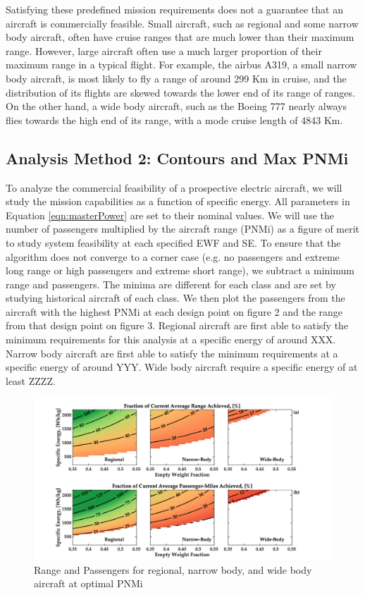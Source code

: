 \documentclass{achemso}
\begin{document}
Satisfying these predefined mission requirements does not a guarantee that an aircraft is commercially feasible. Small aircraft, such as regional and some narrow body aircraft, often have cruise ranges that are much lower than their maximum range. However, large aircraft often use a much larger proportion of their maximum range in a typical flight. For example, the airbus A319, a small narrow body aircraft, is most likely to fly a range of around 299 Km in cruise, and the distribution of its flights are skewed towards the lower end of its range of ranges. On the other hand, a wide body aircraft, such as the Boeing 777 nearly always flies towards the high end of its range, with a mode cruise length of 4843 Km. 

\subsection{Analysis Method 2: Contours and Max PNMi}

To analyze the commercial feasibility of a prospective electric aircraft, we will study the mission capabilities as a function of specific energy. All parameters in Equation \eqref{eqn:masterPower} are set to their nominal values. We will use the number of passengers multiplied by the aircraft range (PNMi) as a figure of merit to study system feasibility at each specified EWF and SE. To ensure that the algorithm does not converge to a corner case (e.g. no passengers and extreme long range or high passengers and extreme short range), we subtract a minimum range and passengers. The minima are different for each class and are set by studying historical aircraft of each class. We then plot the passengers from the aircraft with the highest PNMi at each design point on figure 2 and the range from that design point on figure 3. Regional aircraft are first able to satisfy the minimum requirements for this analysis at a specific energy of around XXX. Narrow body aircraft are first able to satisfy the minimum requirements at a specific energy of around YYY. Wide body aircraft require a specific energy of at least ZZZZ. 

\begin{figure}[htp]
\centering
\includegraphics[width=\textwidth]{Figures/contours.png}\hfill
\caption{Range and Passengers for regional, narrow body, and wide body aircraft at optimal PNMi}
\label{fig:figure2}
\end{figure}
\end{document}
